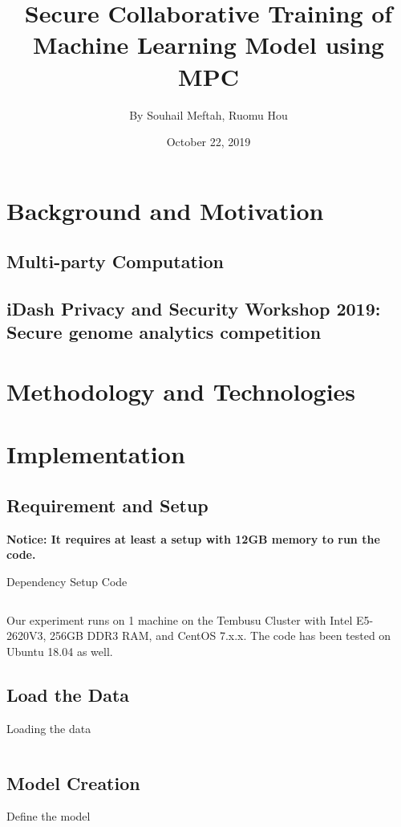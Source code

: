 \documentclass[a4paper,12pt]{article}
\begin{document}
\title{\Large{\textbf{Secure Collaborative Training of Machine Learning Model using MPC}}}
\author{By Souhail Meftah, Ruomu Hou}
\date{October 22, 2019}
\maketitle
\let\cleardoublepage\clearpage
\setcounter{page}{1}
\fancyhf{}



\section{Background and Motivation}

\subsection{Multi-party Computation}

\subsection{iDash Privacy and Security Workshop 2019: Secure genome analytics competition}

\section{Methodology and Technologies}

\section{Implementation}
\subsection{Requirement and Setup}
\textbf{Notice: It requires at least a setup with 12GB memory to run the code.}

\begin{listing}[H]
	\caption{Dependency Setup Code}
	\inputminted[frame=single,framesep=10pt,linenos]{bash}{1_prep.sh}
\end{listing}

Our experiment runs on 1 machine on the Tembusu Cluster with Intel E5-2620V3, 256GB DDR3 RAM, and CentOS 7.x.x. The code has been tested on Ubuntu 18.04 as well. 

\subsection{Load the Data}
\begin{listing}[H]
	\caption{Loading the data}
	\inputminted[frame=single,framesep=10pt,linenos]{python3}{load_data.py}
\end{listing}
\subsection{Model Creation}
\begin{listing}[H]
	\caption{Define the model}
	\inputminted[frame=single,framesep=10pt,linenos]{python3}{torch_model.py}
\end{listing}
\end{document}

